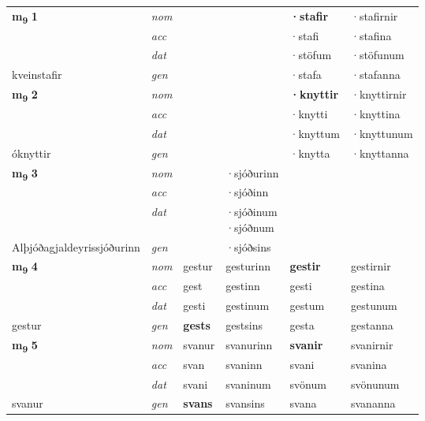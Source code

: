 \begin{longtable}[l]{X>{\footnotesize\itshape}XXXXX}
\multirow{3}{*}{{{\textbf{m{\textsubscript{9}}} \Large{\textbf{1}}}}}  
 & nom &  &     & \textbf{·stafir} & ·stafirnir  \\*
 & acc &   &    & ·stafi  & ·stafina \\*
 & dat &  &    & ·stöfum & ·stöfunum \\*
 {\footnotesize{kveinstafir}} &  gen & \textbf{}  &   & ·stafa & ·stafanna \\
\cmidrule{1-6}


\multirow{3}{*}{{{\textbf{m{\textsubscript{9}}} \Large{\textbf{2}}}}}  
 & nom &  &     & \textbf{·knyttir} & ·knyttirnir  \\*
 & acc &   &    & ·knytti  & ·knyttina \\*
 & dat &  &    & ·knyttum & ·knyttunum \\*
 {\footnotesize{óknyttir}} &  gen & \textbf{}  &   & ·knytta & ·knyttanna \\
\cmidrule{1-6}


\multirow{3}{*}{{{\textbf{m{\textsubscript{9}}} \Large{\textbf{3}}}}}  
 & nom &  & ·sjóðurinn    & \textbf{} &   \\*
 & acc &   & ·sjóðinn   &   &  \\*
 & dat &  & \specialcell{·sjóðinum\\  ·sjóðnum}   &  &  \\*
 {\footnotesize{Alþjóðagjaldeyrissjóðurinn}} &  gen & \textbf{}  & ·sjóðsins  &  &  \\
\cmidrule{1-6}


\multirow{3}{*}{{{\textbf{m{\textsubscript{9}}} \Large{\textbf{4}}}}}  
 & nom & gestur & gesturinn    & \textbf{gestir} & gestirnir  \\*
 & acc & gest  & gestinn   & gesti  & gestina \\*
 & dat & gesti & gestinum   & gestum & gestunum \\*
 {\footnotesize{gestur}} &  gen & \textbf{gests}  & gestsins  & gesta & gestanna \\
\cmidrule{1-6}


\multirow{3}{*}{{{\textbf{m{\textsubscript{9}}} \Large{\textbf{5}}}}}  
 & nom & svanur & svanurinn    & \textbf{svanir} & svanirnir  \\*
 & acc & svan  & svaninn   & svani  & svanina \\*
 & dat & svani & svaninum   & svönum & svönunum \\*
 {\footnotesize{svanur}} &  gen & \textbf{svans}  & svansins  & svana & svananna \\
\cmidrule{1-6}



\end{longtable}
